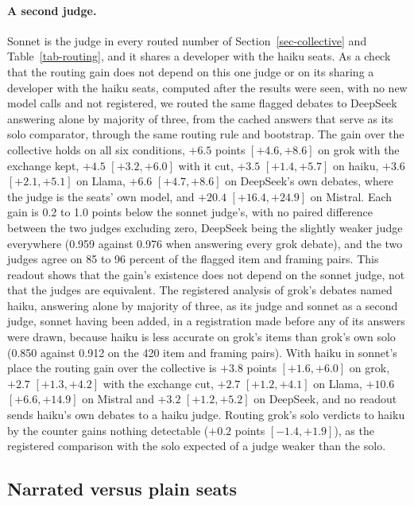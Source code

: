 \paragraph{A second judge.}
Sonnet is the judge in every routed number of Section~\ref{sec-collective}
and Table~\ref{tab-routing}, and it shares a developer with the haiku seats.
As a check that the routing gain does not depend on this one judge or on its
sharing a developer with the haiku seats, computed after the results were
seen, with no new model calls and not registered, we routed the same flagged
debates to DeepSeek answering alone by majority of three, from the cached
answers that serve as its solo comparator, through the same routing rule and
bootstrap. The gain over the collective holds on all six conditions, $+6.5$
points $[+4.6, +8.6]$ on grok with the exchange kept, $+4.5$ $[+3.2, +6.0]$
with it cut, $+3.5$ $[+1.4, +5.7]$ on haiku, $+3.6$ $[+2.1, +5.1]$ on Llama,
$+6.6$ $[+4.7, +8.6]$ on DeepSeek's own debates, where the judge is the
seats' own model, and $+20.4$ $[+16.4, +24.9]$ on Mistral. Each gain is 0.2
to 1.0 points below the sonnet judge's, with no paired difference between
the two judges excluding zero, DeepSeek being the slightly weaker judge
everywhere (0.959 against 0.976 when answering every grok debate), and the
two judges agree on 85 to 96 percent of the flagged item and framing pairs.
This readout shows that the gain's existence does not depend on the sonnet
judge, not that the judges are equivalent.
The registered analysis of grok's debates named haiku, answering alone by
majority of three, as its judge and sonnet as a second judge, sonnet having
been added, in a registration made before any of its answers were drawn,
because haiku is less accurate on grok's items than grok's own solo (0.850
against 0.912 on the 420 item and framing pairs). With haiku in sonnet's
place the routing gain over the collective is $+3.8$ points $[+1.6, +6.0]$ on
grok, $+2.7$ $[+1.3, +4.2]$ with the exchange cut, $+2.7$ $[+1.2, +4.1]$ on
Llama, $+10.6$ $[+6.6, +14.9]$ on Mistral and $+3.2$ $[+1.2, +5.2]$ on
DeepSeek, and no readout sends haiku's own debates to a haiku judge. Routing
grok's solo verdicts to haiku by the counter gains nothing detectable
($+0.2$ points $[-1.4, +1.9]$), as the registered comparison with the solo
expected of a judge weaker than the solo.

\subsection{Narrated versus plain seats}
\label{app-seat}

